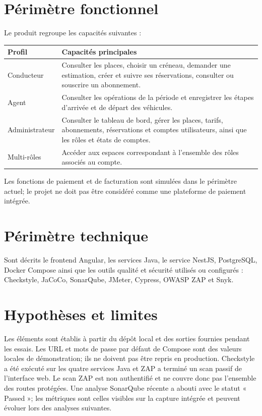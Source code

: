 \documentclass[11pt,a4paper]{report}
\begin{document}
\section{Périmètre fonctionnel}
Le produit regroupe les capacités suivantes :
\begin{longtable}{p{2.7cm}p{10.2cm}}
\toprule
\textbf{Profil} & \textbf{Capacités principales} \\
\midrule
Conducteur & Consulter les places, choisir un créneau, demander une estimation, créer et suivre ses réservations, consulter ou souscrire un abonnement. \\
Agent & Consulter les opérations de la période et enregistrer les étapes d'arrivée et de départ des véhicules. \\
Administrateur & Consulter le tableau de bord, gérer les places, tarifs, abonnements, réservations et comptes utilisateurs, ainsi que les rôles et états de comptes. \\
Multi-rôles & Accéder aux espaces correspondant à l'ensemble des rôles associés au compte. \\
\bottomrule
\end{longtable}
Les fonctions de paiement et de facturation sont simulées dans le périmètre actuel; le projet ne doit pas être considéré comme une plateforme de paiement intégrée.

\section{Périmètre technique}
Sont décrits le frontend Angular, les services Java, le service NestJS, PostgreSQL, Docker Compose ainsi que les outils qualité et sécurité utilisés ou configurés : Checkstyle, JaCoCo, SonarQube, JMeter, Cypress, OWASP ZAP et Snyk.

\section{Hypothèses et limites}
Les éléments sont établis à partir du dépôt local et des sorties fournies pendant les essais. Les URL et mots de passe par défaut de Compose sont des valeurs locales de démonstration; ils ne doivent pas être repris en production. Checkstyle a été exécuté sur les quatre services Java et ZAP a terminé un scan passif de l'interface web. Le scan ZAP est non authentifié et ne couvre donc pas l'ensemble des routes protégées. Une analyse SonarQube récente a abouti avec le statut « Passed »; les métriques sont celles visibles sur la capture intégrée et peuvent évoluer lors des analyses suivantes.
\end{document}
